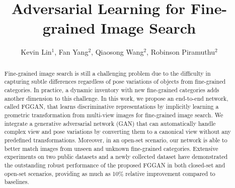 \documentclass[runningheads]{llncs}
\begin{document}

\pagestyle{headings}
\mainmatter

\title{Adversarial Learning for Fine-grained Image Search} %




\author{Kevin Lin$^1$, Fan Yang$^2$, Qiaosong Wang$^2$, Robinson Piramuthu$^2$}

\maketitle

\begin{abstract}
Fine-grained image search is still a challenging problem due to the difficulty in capturing subtle differences regardless of pose variations of objects from fine-grained categories. In practice, a dynamic inventory with new fine-grained categories adds another dimension to this challenge.
In this work, we propose an end-to-end network, called FGGAN, that learns discriminative representations by implicitly learning a geometric transformation from multi-view images for fine-grained image search. 
We integrate a generative adversarial network (GAN) that can automatically handle complex view and pose variations by converting them to a canonical view without any predefined transformations. 
Moreover, in an open-set scenario, our network is able to better match  images from unseen and unknown fine-grained categories.
Extensive experiments on two public datasets and a newly collected dataset have demonstrated the outstanding robust performance of the proposed FGGAN in both closed-set and open-set scenarios, providing as much as 10\% relative improvement compared to baselines.

\end{abstract}
\end{document}
